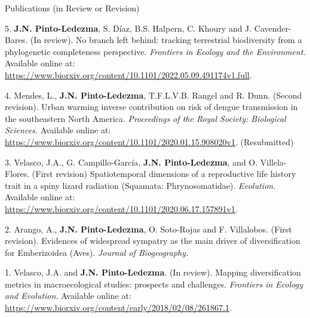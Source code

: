 \documentclass{resume} %
\begin{document}
\begin{rSection}{Publications (in Review or Revision)} 

{5.} {\bf{J.N. Pinto-Ledezma}}, {S. Díaz, B.S. Halpern, C. Khoury and J. Cavender-Bares. (In review). No branch left behind: tracking terrestrial biodiversity from a phylogenetic completeness perspective.} {\em Frontiers in Ecology and the Environment.} {Available online at:} \url {https://www.biorxiv.org/content/10.1101/2022.05.09.491174v1.full}.

{4.} {Mendes, L.,} {\bf{J.N. Pinto-Ledezma}}, {T.F.L.V.B. Rangel and R. Dunn. (Second revision). Urban warming inverse contribution on risk of dengue transmission in the southeastern North America.} {\em Proceedings of the Royal Society: Biological Sciences.} {Available online at:} \url {https://www.biorxiv.org/content/10.1101/2020.01.15.908020v1}. {(Resubmitted)}

{3.} {Velasco, J.A., G. Campillo-García,} {\bf{J.N. Pinto-Ledezma}}, {and O. Villela-Flores. (First revision) Spatiotemporal dimensions of a reproductive life history trait in a spiny lizard radiation (Squamata: Phrynosomatidae).} {\em Evolution.} {Available online at:} \url {https://www.biorxiv.org/content/10.1101/2020.06.17.157891v1}.

{2.} {Arango, A.,} {\bf{J.N. Pinto-Ledezma}}, { O. Soto-Rojas and F. Villalobos. (First revision). Evidences of widespread sympatry as the main driver of diversification for Emberizoidea (Aves).} {\em Journal of Biogeography.}

{1.} {Velasco, J.A. and} {\bf{J.N. Pinto-Ledezma}}. {(In review). Mapping diversification metrics in macroecological studies: prospects and challenges.} {\em Frontiers in Ecology and Evolution.} {Available online at:} \url {https://www.biorxiv.org/content/early/2018/02/08/261867.1}.


\end{rSection}

\end{document}
